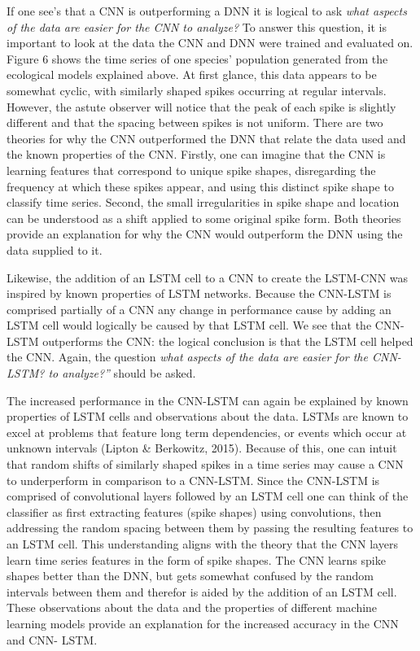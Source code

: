 \documentclass[letterpaper, 10 pt, conference]{ieeeconf}  %
\begin{document}
    If one see’s that a CNN is outperforming a DNN it is logical to ask  \textit{what aspects of the data are easier for the CNN to analyze?} To answer this question, it is important to look at the data the CNN and DNN were trained and evaluated on.  Figure 6 shows the time series of one species’ population generated from the ecological models explained above. At first glance, this data appears to be somewhat cyclic, with similarly shaped spikes occurring at regular intervals. However, the astute observer will notice that the peak of each spike is slightly different and that the spacing between spikes is not uniform. There are two theories for why the CNN outperformed the DNN that relate the data used and the known properties of the CNN. Firstly, one can imagine that the CNN is learning features that correspond to unique spike shapes, disregarding the frequency at which these spikes appear, and using this distinct spike shape to classify time series. Second, the small irregularities in spike shape and location can be understood as a shift applied to some original spike form. Both theories provide an explanation for why the CNN would outperform the DNN using the data supplied to it. 

    Likewise, the addition of an LSTM cell to a CNN to create the LSTM-CNN was inspired by known properties of LSTM networks. Because the CNN-LSTM is comprised partially of a CNN any change in performance cause by adding an LSTM cell would logically be caused by that LSTM cell. We see that the CNN-LSTM outperforms the CNN: the logical conclusion is that the LSTM cell helped the CNN. Again, the question 
    \textit{what aspects of the data are easier for the CNN-LSTM? to analyze?”} should be asked. 
    
    The increased performance in the CNN-LSTM can again be explained by known properties of LSTM cells and observations about the data. LSTMs are known to excel at problems that feature long term dependencies, or events which occur at unknown intervals (Lipton & Berkowitz, 2015). Because of this, one can intuit that random shifts of similarly shaped spikes in a time series may cause a CNN to underperform in comparison to a CNN-LSTM. Since the CNN-LSTM is comprised of convolutional layers followed by an LSTM cell one can think of the classifier as first extracting features (spike shapes) using convolutions, then addressing the random spacing between them by passing the resulting features to an LSTM cell. This understanding aligns with the theory that the CNN layers learn time series features in the form of spike shapes. The CNN learns spike shapes better than the DNN, but gets somewhat confused by the random intervals between them and therefor is aided by the addition of an LSTM cell. These observations about the data and the properties of different machine learning models provide an explanation for the increased accuracy in the CNN and CNN- LSTM. 
\end{document}
